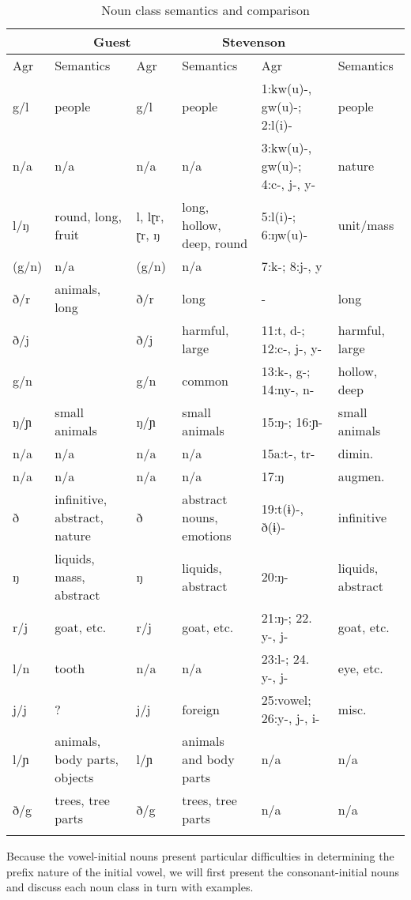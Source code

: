 \begin{table}	
\begin{tabular}{lp{2.5cm}p{0.5cm}p{2.3cm}p{1.7cm}p{2.5cm}}
    \lsptoprule
  \multicolumn{2}{c}{Thotegovela Moro} &    \multicolumn{2}{c}{Guest} &   \multicolumn{2}{c}{Stevenson} \\
\midrule
Agr & Semantics & Agr & Semantics & Agr & Semantics \\
\midrule
g/l	&	people	&	g/l		&	people		&	1:kw(u)-, gw(u)-; 2:l(i)- 		&	people \\
n/a	&	n/a		&	n/a		&	n/a		&	3:kw(u)-, gw(u)-; 4:c-, j-, y- &	 nature \\
l/ŋ	&	round, long, fruit 	&		l, lɽr, ɽr, ŋ&	long, hollow, deep, round		&	5:l(i)-; 6:ŋw(u)-
	&	 unit/mass \\
(g/n)	&	 n/a		&	(g/n)	&		n/a		&	 7:k-; 8:j-, y &	\\
ð/r		&	animals, long &		ð/r	&	 long	&	- &		long \\
ð/j &		&	ð/j&		harmful, large	&	11:t, d-; 12:c-, j-, y- &	 harmful, large\\
g/n	&	 	&		g/n	& common	&	13:k-, g-; 14:ny-, n-	
&	 hollow, deep \\
ŋ/ɲ	&	 small animals	&	ŋ/ɲ	& small animals	&	 15:ŋ-; 
16:ɲ- &	 small animals \\
n/a	&	 n/a &		n/a &	n/a		&	15a:t-, tr-		&	 dimin. \\
n/a	&	 n/a		&	n/a		&	n/a		&	17:ŋ		&	augmen. \\
ð	&	 infinitive, abstract, nature		&	ð		&	abstract nouns, emotions		&	19:t(ɨ)-, ð(ɨ)-		&	infinitive \\
ŋ	&	liquids, mass, abstract		&	ŋ		&	liquids, abstract		&	20:ŋ-		&	liquids, abstract \\
r/j	&	 goat, etc.	&		r/j	& goat, etc.		&	21:ŋ-;
22. y-, j- 	&		goat, etc. \\
l/n	&	 tooth		&	n/a		&	n/a		&	23:l-;
24. y-, j-		&	eye, etc. \\
j/j	&	 ? 	&		j/j		&	foreign		&	25:vowel; 26:y-, j-, i-		&	 misc.\\
l/ɲ	&	 animals, body parts, objects	&	 	l/ɲ		&	 animals and body parts		&	 n/a	&	 	n/a \\
ð/g	&	 trees, tree parts		&	 ð/g		&	 trees, tree parts		&	 n/a		&	 n/a \\
\lspbottomrule 
\end{tabular}  
\caption{Noun class semantics and comparison}
  \label{tab:ch6:5}
\end{table}

Because the vowel-initial nouns present particular difficulties in determining the prefix nature of the initial vowel, we will first present the consonant-initial nouns and discuss each noun class in turn with examples.

